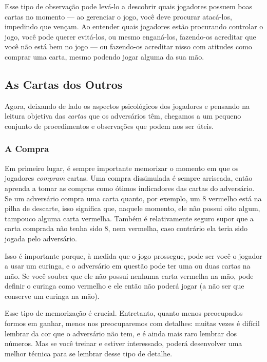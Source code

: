Esse tipo de observação pode levá-lo a descobrir quais jogadores possuem boas cartas no momento --- ao gerenciar o jogo, você deve procurar atacá-los, impedindo que vençam. Ao entender quais jogadores estão procurando controlar o jogo, você pode querer evitá-los, ou mesmo enganá-los, fazendo-os acreditar que você não está bem no jogo --- ou fazendo-os acreditar nisso com atitudes como comprar uma carta, mesmo podendo jogar alguma da sua mão.

\subsection{As Cartas dos Outros}

\label{leituradosjogadorescartas}

Agora, deixando de lado os aspectos psicológicos dos jogadores e pensando na leitura objetiva das \textit{cartas} que os adversários têm, chegamos a um pequeno conjunto de procedimentos e observações que podem nos ser úteis.

\subsubsection{A Compra}

Em primeiro lugar, é sempre importante memorizar o momento em que os jogadores \textit{compram} cartas. Uma compra dissimulada é sempre arriscada, então aprenda a tomar as compras como ótimos indicadores das cartas do adversário. Se um adversário compra uma carta quanto, por exemplo, um 8 vermelho está na pilha de descarte, isso significa que, naquele momento, ele não possui oito algum, tampouco alguma carta vermelha. Também é relativamente seguro supor que a carta comprada não tenha sido 8, nem vermelha, caso contrário ela teria sido jogada pelo adversário.

Isso é importante porque, à medida que o jogo prossegue, pode ser você o jogador a usar um curinga, e o adversário em questão pode ter uma ou duas cartas na mão. Se você souber que ele não possui nenhuma carta vermelha na mão, pode definir o curinga como vermelho e ele então não poderá jogar (a não ser que conserve um curinga na mão).

Esse tipo de memorização é crucial. Entretanto, quanto menos preocupados formos em ganhar, menos nos preocuparemos com detalhes: muitas vezes é difícil lembrar da cor que o adversário não tem, e é ainda mais raro lembrar dos números. Mas se você treinar e estiver interessado, poderá desenvolver uma melhor técnica para se lembrar desse tipo de detalhe.


